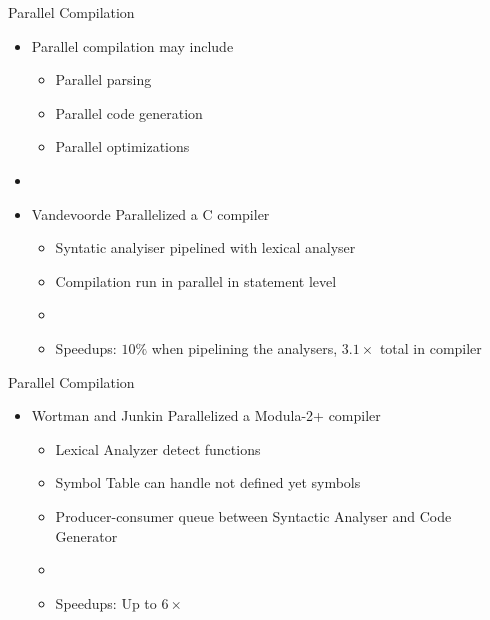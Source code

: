 \begin{frame}{Parallel Compilation}
\begin{itemize}
    \item Parallel compilation may include
    \begin{itemize}
        \item Parallel parsing
        \item Parallel code generation
        \item Parallel optimizations
    \end{itemize}
    \item[]

    \item Vandevoorde \cite{vandevoorde1988parallel} Parallelized a C compiler
    \begin{itemize}
        \item Syntatic analyiser pipelined with lexical analyser
        \item Compilation run in parallel in statement level
        \item[]
        \item Speedups: $10\%$ when pipelining the analysers, $3.1\times$ total in compiler
    \end{itemize}
\end{itemize}
\end{frame}


\begin{frame}{Parallel Compilation}
\begin{itemize}
    \item Wortman and Junkin \cite{wortman1992} Parallelized a Modula-2+ compiler
    \begin{itemize}
        \item Lexical Analyzer detect functions
        \item Symbol Table can handle not defined yet symbols
        \item Producer-consumer queue between Syntactic Analyser and Code Generator
        \item[]
        \item Speedups: Up to $6\times$
    \end{itemize}
\end{itemize}
\end{frame}


